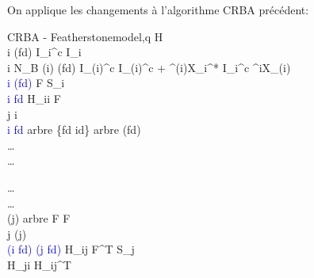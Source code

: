 \documentclass{report}
\begin{document}
\begin{flushleft}
On applique les changements à l'algorithme CRBA précédent: \vspace{0.3cm} \\


\begin{minipage}[t]{\textwidth}
\setlength{\columnsep}{10pt}
\setlength{\columnseprule}{0.5pt}
\begin{multicols}{2}\raggedcolumns\small
    	\begin{spacing}{1.5}
		\begin{pseudocode}{CRBA - Featherstone}{model,q} \label{algo_crbaFeatherstoneH11H21}
    H  \\
		\FOREACH i \in \nu(fd) \DO
		  I_i^c \GETS I_i \\
		\FOR i \GETS N_B  \DO
		\BEGIN
		  \IF \lambda(i) \in \nu(fd)
		  \THEN
		    I_{\lambda(i)}^c \GETS I_{\lambda(i)}^c + {^{\lambda(i)}X_i^*} \: {I_i^c} \: {^iX_{\lambda(i)}} \\
		  \IF \textcolor{blue}{i \in \nu(fd)} \THEN
		  \BEGIN
			  F  \: S_i \\
			  \IF \textcolor{blue}{i \in fd} \THEN H_{ii}  F \\
			  j \GETS i \\
			  \IF \textcolor{blue}{i \in fd}
			  \THEN arbre \GETS \{fd \cup id\}
			  \ELSE arbre \GETS \nu(fd) \\
			  \ldots
			\END \\
			\ldots
		\END
	  \end{pseudocode}
	  
	  \begin{pseudocode}[display]{}{}
	  \DO
	  \BEGIN
	  \ldots \\
	    \THEN
		  \BEGIN
		    \ldots \\
			  \WHILE \lambda(j) \in arbre \DO
			  \BEGIN
			    F  F \\
			    j \GETS \lambda(j) \\
			    \IF \textcolor{blue}{(i \in fd) \OR (j \in fd)} \THEN
			    \BEGIN
				    H_{ij} \GETS F^T S_j \\
				    H_{ji} \GETS H_{ij}^T
			    \END
			  \END
			\END
	  \END
	  \end{pseudocode}
	  \end{spacing}
\end{multicols}
\end{minipage} \vspace{0.3cm} \\


\end{flushleft}
\end{document}
